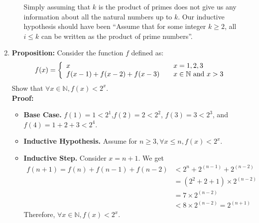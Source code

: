 \documentclass[11pt, preview]{standalone} %
\begin{document}
\begin{enumerate}
\begin{enumerate}
\begin{Choices}
Simply assuming that $k$ is the product of primes does not give us any information about all the natural numbers up to $k$. Our inductive hypothesis should have been ``Assume that for some integer $k \geq 2$, all $i \leq k$ can be written as the product of prime numbers''.
\end{Choices}
\end{enumerate}

\item 
{\bf Proposition:} Consider the function $f$ defined as:
\[ f(x) = \left\{ 
  \begin{array}{l l}
    x & \quad x = 1,2,3\\
    f(x-1)+f(x-2)+f(x-3) & \quad x \in \mathbb{N} \text{ and } x > 3
  \end{array} \right.\]
Show that $\forall x \in \mathbb{N}, f(x)<2^x$.
\\
{\bf Proof:} 
\begin{itemize}
\item {\bf Base Case.} $f(1) = 1 < 2^1$,$f(2) = 2 < 2^2$, $f(3) = 3 < 2^3$, and $f(4) = 1 + 2 + 3 < 2^4$.
\item {\bf Inductive Hypothesis.} Assume for $n \geq 3, \forall x \leq n, f(x) < 2^x$.
\item {\bf Inductive Step.} 
Consider $x = n+1$. We get
\begin{align}
  f(n + 1) = f(n) + f(n-1) + f(n-2) &< 2^n + 2^{(n-1)} + 2^{(n-2)}\\
  &= (2^2+2+1)\times 2^{(n-2)}\\
  &= 7\times 2^{(n-2)}\\
  &< 8\times 2^{(n-2)} = 2^{(n+1)}
\end{align}
Therefore, $\forall x \in \mathbb{N}, f(x)<2^x$.
\end{itemize}
\begin{enumerate}
\end{enumerate}


\end{enumerate}
\end{document}
